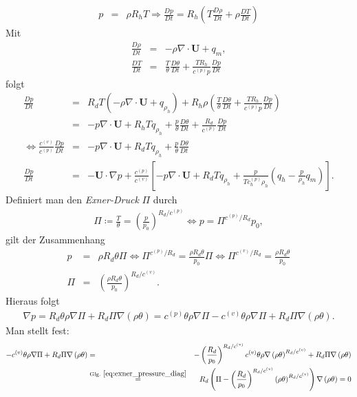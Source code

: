 \documentclass{book}
\newcommand{\md}[1]{\frac{D#1}{Dt}}
\begin{document}
%
\begin{eqnarray}
p & = & \rho R_hT \Rightarrow \md{p} = R_h\left(T\md{\rho} + \rho\md{T}\right)
\end{eqnarray}
%
Mit
%
\begin{eqnarray}
\md{\rho} & = & -\rho\nabla\cdot\mathbf{U} + q_m,\\
\md{T} & = & \frac{T}{\theta}\md{\theta} + \frac{TR_h}{c^{(p)}p}\md{p}
\end{eqnarray}
%
folgt
%
\begin{eqnarray}
\md{p} & = & R_dT\left(-\rho\nabla\cdot\mathbf{U} + q_{\rho_h}\right) + R_h\rho\left(\frac{T}{\theta}\md{\theta} + \frac{TR_h}{c^{(p)}p}\md{p}\right)\nonumber\\
& = & -p\nabla\cdot\mathbf{U} + R_hTq_{\rho_h} + \frac{p}{\theta}\md{\theta} + \frac{R_d}{c^{(p)}}\md{p}\nonumber\\
\Leftrightarrow \frac{c^{(v)}}{c^{(p)}}\md{p} & = & -p\nabla\cdot\mathbf{U} + R_dTq_{\rho_h} + \frac{p}{\theta}\md{\theta}\nonumber\\
\md{p} & = & -\mathbf{U}\cdot\nabla p + \frac{c^{(p)}}{c^{(v)}}\left[-p\nabla\cdot\mathbf{U} + R_dTq_{\rho_h} + \frac{p}{Tc_h^{(p)}\rho_h}\left(q_h - \frac{p}{\rho_h}q_m\right)\right].
\end{eqnarray}
%
Definiert man den \textit{Exner-Druck} $\Pi$ durch
%
\begin{eqnarray}
\Pi \coloneqq \frac{T}{\theta} = \left(\frac{p}{p_0}\right)^{R_d/c^{(p)}} \Leftrightarrow p = \Pi^{c^{(p)}/R_d}p_0,
\end{eqnarray}
%
gilt der Zusammenhang
%
\begin{eqnarray}
p & = & \rho R_d\theta\Pi \Leftrightarrow \Pi^{c^{(p)}/R_d} = \frac{\rho R_d\theta}{p_0}\Pi \Leftrightarrow \Pi^{c^{(v)}/R_d} = \frac{\rho R_d\theta}{p_0}\nonumber\\
\Pi & = & \left(\frac{\rho R_d\theta}{p_0}\right)^{R_d/c^{(v)}}.\label{eq:exner_pressure_diag}
\end{eqnarray}
%
Hieraus folgt
%
\begin{eqnarray}
\nabla p = R_d \theta\rho\nabla\Pi + R_d\Pi\nabla\left(\rho\theta\right) = c^{(p)}\theta\rho\nabla\Pi - c^{(v)}\theta\rho\nabla\Pi + R_d\Pi\nabla\left(\rho\theta\right).
\end{eqnarray}
%
Man stellt fest:
%
\begin{eqnarray}
-c^{(v)}\theta\rho\nabla\Pi + R_d\Pi\nabla\left(\rho\theta\right) & = & -\left(\frac{R_d}{p_0}\right)^{R_d/c^{(v)}}c^{(v)}\theta\rho\nabla\left(\rho\theta\right)^{R_d/c^{(v)}} + R_d\Pi\nabla\left(\rho\theta\right)\nonumber\\
 & \stackrel{\text{Glg. }\eqref{eq:exner_pressure_diag}}{=} & R_d\left(\Pi - \left(\frac{R_d}{p_0}\right)^{R_d/c^{(v)}}\left(\rho\theta\right)^{R_d/c^{(v)}}\right)\nabla\left(\rho\theta\right) = 0
\end{eqnarray}
\end{document}

